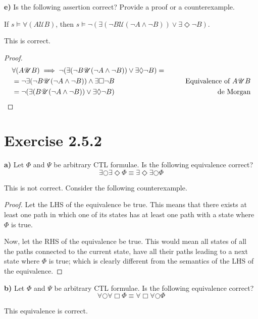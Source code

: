\documentclass[titlepage, letterpaper, fleqn]{article}
\newcommand{\spacepls}{\vspace{5mm}}
\newcommand{\until}{\mathscr{U}}
\begin{document}
{\large \textbf{e)} Is the following assertion correct? Provide a proof or a counterexample.

If \(s \models \forall (A \until B)\), then \(s \models \neg (\exists (\neg B \until(\neg A \wedge \neg B)) \vee \exists \Diamond \neg B)\).}

\spacepls

This is correct.

\begin{proof}
\begin{align*}
& \forall (A \until B) \implies \neg (\exists (\neg B \until(\neg A \wedge \neg B)) \vee \exists \Diamond \neg B) =
\\ & = \neg \exists (\neg B \until(\neg A \wedge \neg B)) \wedge \exists \Box \neg B & \tag*{Equivalence of $A \until B$}
\\ & = \neg (\exists (B \until(\neg A \wedge \neg B)) \vee \exists \Diamond \neg B) & \tag*{de Morgan}
\end{align*}
\end{proof}

\section{Exercise 2.5.2}

{\large \textbf{a)} Let \(\Phi\) and \(\Psi\) be arbitrary CTL formulae. Is the following equivalence correct?
\[\exists \bigcirc \exists \Diamond \Phi \equiv \exists \Diamond \exists \bigcirc \Phi\]}

This is not correct. Consider the following counterexample.

\begin{proof}
Let the LHS of the equivalence be true.
This means that there exists at least one path in which one of its states has at least one path with a state where \(\Phi\) is true.

Now, let the RHS of the equivalence be true.
This would mean all states of all the paths connected to the current state, have all their paths leading to a next state where \(\Phi\) is true; which is clearly different from the semantics of the LHS of the equivalence.
\end{proof}

{\large \textbf{b)} Let \(\Phi\) and \(\Psi\) be arbitrary CTL formulae. Is the following equivalence correct?
\[\forall \bigcirc \forall \Box \Phi \equiv \forall \Box \forall \bigcirc \Phi\]}

This equivalence is correct.
\end{document}
